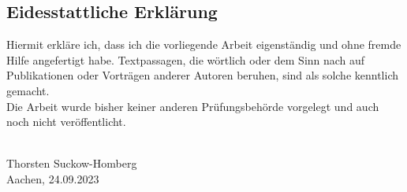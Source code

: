 \thispagestyle{empty}
\pagebreak
\hspace{0pt}
\vfill

\subsection*{Eidesstattliche Erklärung}
Hiermit erkläre ich, dass ich die vorliegende Arbeit eigenständig und ohne fremde Hilfe angefertigt habe. Textpassagen, die wörtlich oder dem Sinn nach auf Publikationen oder Vorträgen anderer Autoren beruhen, sind als solche kenntlich gemacht.\\

Die Arbeit wurde bisher keiner anderen Prüfungsbehörde vorgelegt und auch noch nicht veröffentlicht.\\


\begin{center}
\underline{\hspace{6cm}}\\
Thorsten Suckow-Homberg \\Aachen, 24.09.2023
\end{center}


\vfill
\hspace{0pt}
\pagebreak
